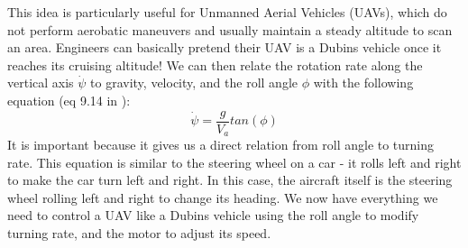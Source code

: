 \documentclass[12pt,journal,compsoc]{IEEEtran}
\begin{document}
This idea is particularly useful for Unmanned Aerial Vehicles (UAVs), which do not perform aerobatic maneuvers and usually maintain a steady altitude to scan an area. Engineers can basically pretend their UAV is a Dubins vehicle once it reaches its cruising altitude! We can then relate the rotation rate along the vertical axis $\dot{\psi}$ to gravity, velocity, and the roll angle $\phi$ with the following equation (eq 9.14 in \cite{S-U-A}):
\[ \dot{\psi} = \frac{g}{V_a}tan(\phi) \]
It is important because it gives us a direct relation from roll angle to turning rate. This equation is similar to the steering wheel on a car - it rolls left and right to make the car turn left and right. In this case, the aircraft itself is the steering wheel rolling left and right to change its heading. We now have everything we need to control a UAV like a Dubins vehicle using the roll angle to modify turning rate, and the motor to adjust its speed.
\end{document}
